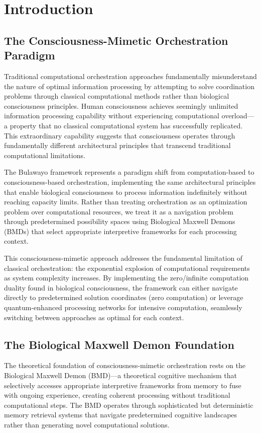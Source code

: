\documentclass[12pt,a4paper]{article}
\begin{document}
\section{Introduction}

\subsection{The Consciousness-Mimetic Orchestration Paradigm}

Traditional computational orchestration approaches fundamentally misunderstand the nature of optimal information processing by attempting to solve coordination problems through classical computational methods rather than biological consciousness principles. Human consciousness achieves seemingly unlimited information processing capability without experiencing computational overload—a property that no classical computational system has successfully replicated. This extraordinary capability suggests that consciousness operates through fundamentally different architectural principles that transcend traditional computational limitations.

The Bulawayo framework represents a paradigm shift from computation-based to consciousness-based orchestration, implementing the same architectural principles that enable biological consciousness to process information indefinitely without reaching capacity limits. Rather than treating orchestration as an optimization problem over computational resources, we treat it as a navigation problem through predetermined possibility spaces using Biological Maxwell Demons (BMDs) that select appropriate interpretive frameworks for each processing context.

This consciousness-mimetic approach addresses the fundamental limitation of classical orchestration: the exponential explosion of computational requirements as system complexity increases. By implementing the zero/infinite computation duality found in biological consciousness, the framework can either navigate directly to predetermined solution coordinates (zero computation) or leverage quantum-enhanced processing networks for intensive computation, seamlessly switching between approaches as optimal for each context.

\subsection{The Biological Maxwell Demon Foundation}

The theoretical foundation of consciousness-mimetic orchestration rests on the Biological Maxwell Demon (BMD)—a theoretical cognitive mechanism that selectively accesses appropriate interpretive frameworks from memory to fuse with ongoing experience, creating coherent processing without traditional computational steps. The BMD operates through sophisticated but deterministic memory retrieval systems that navigate predetermined cognitive landscapes rather than generating novel computational solutions.
\end{document}
